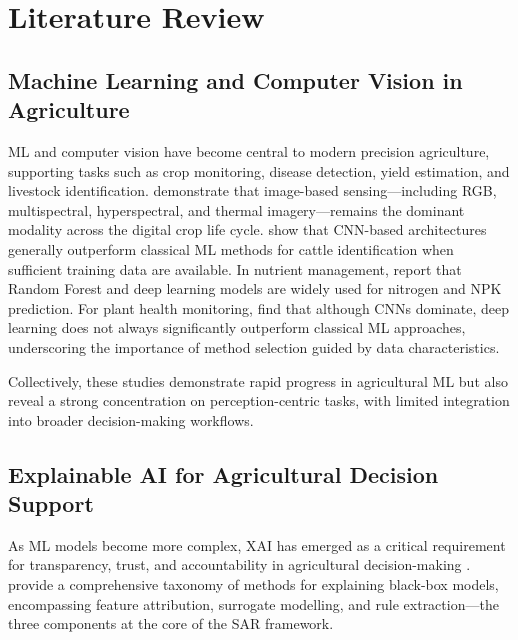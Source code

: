 \documentclass[3p,twocolumn,authoryear]{elsarticle}
\begin{document}
\section{Literature Review}

\subsection{Machine Learning and Computer Vision in Agriculture}

ML and computer vision have become central to modern precision
agriculture, supporting tasks such as crop monitoring, disease detection,
yield estimation, and livestock identification.
\citet{ghazal2024survey} demonstrate that image-based sensing---including
RGB, multispectral, hyperspectral, and thermal imagery---remains the
dominant modality across the digital crop life cycle.
\citet{hossain2022cattle} show that CNN-based architectures generally
outperform classical ML methods for cattle identification when sufficient
training data are available.
In nutrient management, \citet{ennaji2023nutrient} report that Random
Forest and deep learning models are widely used for nitrogen and NPK
prediction.
For plant health monitoring, \citet{omaye2024disease} find that although
CNNs dominate, deep learning does not always significantly outperform
classical ML approaches, underscoring the importance of method selection
guided by data characteristics.

Collectively, these studies demonstrate rapid progress in agricultural ML
but also reveal a strong concentration on perception-centric tasks, with
limited integration into broader decision-making workflows.

\subsection{Explainable AI for Agricultural Decision Support}

As ML models become more complex, XAI has emerged as a critical
requirement for transparency, trust, and accountability in agricultural
decision-making \citep{arrieta2020,linardatos2021}.
\citet{guidotti2019} provide a comprehensive taxonomy of methods for
explaining black-box models, encompassing feature attribution, surrogate
modelling, and rule extraction---the three components at the core of the
SAR framework.
\end{document}
